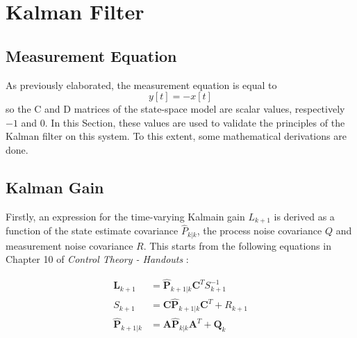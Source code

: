 \documentclass[a4paper,kul]{kulakarticle} %
\begin{document}
\newpage
\section{Kalman Filter}
\subsection{Measurement Equation}
As previously elaborated, the measurement equation is equal to 
\begin{equation}
	y[t] = -x[t]
	\label{eq:eq7}
\end{equation}
so the C and D matrices of the state-space model are scalar values, respectively $-1$ and $0$. In this Section, these values are used to validate the principles of the Kalman filter on this system. To this extent, some mathematical derivations are done. 

\subsection{Kalman Gain}

Firstly, an expression for the time-varying Kalmain gain $L_{k+1}$ is derived as a function of the state estimate covariance $\hat{P}_{k|k}$, the process noise covariance $Q$ and measurement noise covariance $R$. This starts from the following equations in Chapter 10 of \textit{Control Theory - Handouts} \cite{slidescontroltheory}:

\begin{align}
	\mathbf{L}_{k+1} &= \mathbf{\hat{P}}_{k+1|k} \mathbf{C}^T S_{k+1}^{-1} \label{eq:eq8}\\
	S_{k+1} &= \mathbf{C \hat{P}}_{k+1|k} \mathbf{C}^T + R_{k+1} \label{eq:eq9}\\
	\mathbf{\hat{P}}_{k+1|k} &= \mathbf{A} \mathbf{\hat{P}}_{k|k} \mathbf{A}^T + \mathbf{Q}_k \label{eq:eq10}
\end{align}
\end{document}
